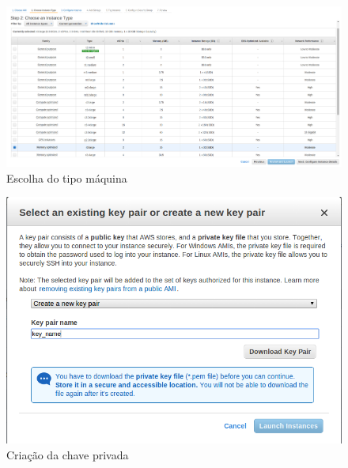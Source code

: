 \begin{figure}[htp]
    \begin{center}
    \includegraphics[width=1\textwidth]{img/aws_setup_ec2_maquina}
    \end{center}
    \caption{Escolha do tipo máquina}
    \label{fig:aws_setup_ec2_maquina}
\end{figure}

\begin{figure}[htp]
    \begin{center}
    \includegraphics[width=1\textwidth]{img/aws_setup_keypair}
    \end{center}
    \caption{Criação da chave privada}
    \label{fig:aws_setup_keypair}
\end{figure}

